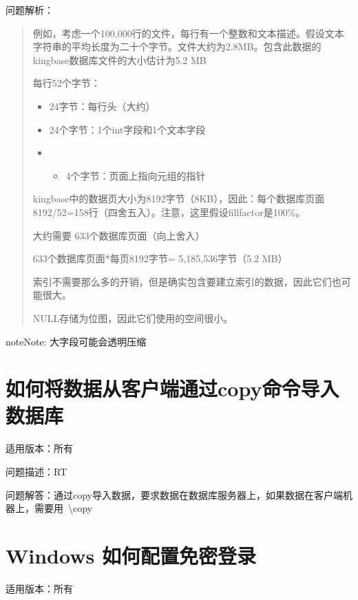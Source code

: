 \documentclass[letterpaper,10pt,english]{sphinxmanual}
\begin{document}
问题解析：
\begin{quote}

例如，考虑一个100,000行的文件，每行有一个整数和文本描述。假设文本字符串的平均长度为二十个字节。文件大约为2.8MB。包含此数据的kingbase数据库文件的大小估计为5.2 MB

每行52个字节：
\begin{itemize}
\item {} 
24字节：每行头（大约）

\item {} 
24个字节：1个int字段和1个文本字段

\item {} \begin{itemize}
\item {} 
4个字节：页面上指向元组的指针

\end{itemize}

\end{itemize}

kingbase中的数据页大小为8192字节（8KB），因此：每个数据库页面8192/52=158行（四舍五入）。注意，这里假设fillfactor是100\%。

大约需要 633个数据库页面（向上舍入）

633个数据库页面*每页8192字节= 5,185,536字节（5.2 MB）

索引不需要那么多的开销，但是确实包含要建立索引的数据，因此它们也可能很大。

NULL存储为位图，因此它们使用的空间很小。
\end{quote}

\begin{sphinxadmonition}{note}{Note:}
大字段可能会透明压缩
\end{sphinxadmonition}


\section{如何将数据从客户端通过copy命令导入数据库}
\label{\detokenize{sql:copy}}
适用版本：所有

问题描述：RT

问题解答：通过copy导入数据，要求数据在数据库服务器上，如果数据在客户端机器上，需要用 \textbackslash{}copy


\section{Windows 如何配置免密登录}
\label{\detokenize{sql:id16}}
适用版本：所有
\end{document}
